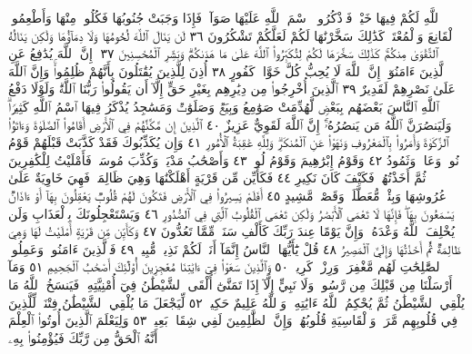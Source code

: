 ٱللَّهِ لَكُمْ فِيهَا خَيْرࣱۖ فَٱذْكُرُوا۟ ٱسْمَ ٱللَّهِ عَلَيْهَا صَوَآفَّۖ فَإِذَا وَجَبَتْ
جُنُوبُهَا فَكُلُوا۟ مِنْهَا وَأَطْعِمُوا۟ ٱلْقَانِعَ وَٱلْمُعْتَرَّۚ كَذَٰلِكَ سَخَّرْنَٰهَا
لَكُمْ لَعَلَّكُمْ تَشْكُرُونَ ٣٦ لَن يَنَالَ ٱللَّهَ لُحُومُهَا وَلَا دِمَآؤُهَا
وَلَٰكِن يَنَالُهُ ٱلتَّقْوَىٰ مِنكُمْۚ كَذَٰلِكَ سَخَّرَهَا لَكُمْ لِتُكَبِّرُوا۟
ٱللَّهَ عَلَىٰ مَا هَدَىٰكُمْۗ وَبَشِّرِ ٱلْمُحْسِنِينَ ٣٧۞ إِنَّ ٱللَّهَ يُدَٰفِعُ
عَنِ ٱلَّذِينَ ءَامَنُوٓا۟ۗ إِنَّ ٱللَّهَ لَا يُحِبُّ كُلَّ خَوَّانࣲ كَفُورٍ ٣٨
أُذِنَ لِلَّذِينَ يُقَٰتَلُونَ بِأَنَّهُمْ ظُلِمُوا۟ۚ وَإِنَّ ٱللَّهَ عَلَىٰ نَصْرِهِمْ
لَقَدِيرٌ ٣٩ ٱلَّذِينَ أُخْرِجُوا۟ مِن دِيَٰرِهِم بِغَيْرِ حَقٍّ إِلَّآ أَن يَقُولُوا۟
رَبُّنَا ٱللَّهُۗ وَلَوْلَا دَفْعُ ٱللَّهِ ٱلنَّاسَ بَعْضَهُم بِبَعْضࣲ لَّهُدِّمَتْ
صَوَٰمِعُ وَبِيَعࣱ وَصَلَوَٰتࣱ وَمَسَٰجِدُ يُذْكَرُ فِيهَا ٱسْمُ ٱللَّهِ
كَثِيرࣰاۗ وَلَيَنصُرَنَّ ٱللَّهُ مَن يَنصُرُهُۥٓۚ إِنَّ ٱللَّهَ لَقَوِيٌّ
عَزِيزٌ ٤٠ ٱلَّذِينَ إِن مَّكَّنَّٰهُمْ فِي ٱلْأَرْضِ أَقَامُوا۟ ٱلصَّلَوٰةَ
وَءَاتَوُا۟ ٱلزَّكَوٰةَ وَأَمَرُوا۟ بِٱلْمَعْرُوفِ وَنَهَوْا۟ عَنِ ٱلْمُنكَرِۗ
وَلِلَّهِ عَٰقِبَةُ ٱلْأُمُورِ ٤١ وَإِن يُكَذِّبُوكَ فَقَدْ كَذَّبَتْ
قَبْلَهُمْ قَوْمُ نُوحࣲ وَعَادࣱ وَثَمُودُ ٤٢ وَقَوْمُ إِبْرَٰهِيمَ وَقَوْمُ
لُوطࣲ ٤٣ وَأَصْحَٰبُ مَدْيَنَۖ وَكُذِّبَ مُوسَىٰۖ فَأَمْلَيْتُ لِلْكَٰفِرِينَ
ثُمَّ أَخَذْتُهُمْۖ فَكَيْفَ كَانَ نَكِيرِ ٤٤ فَكَأَيِّن مِّن قَرْيَةٍ
أَهْلَكْنَٰهَا وَهِيَ ظَالِمَةࣱ فَهِيَ خَاوِيَةٌ عَلَىٰ عُرُوشِهَا وَبِئْرࣲ
مُّعَطَّلَةࣲ وَقَصْرࣲ مَّشِيدٍ ٤٥ أَفَلَمْ يَسِيرُوا۟ فِي ٱلْأَرْضِ فَتَكُونَ
لَهُمْ قُلُوبࣱ يَعْقِلُونَ بِهَآ أَوْ ءَاذَانࣱ يَسْمَعُونَ بِهَاۖ فَإِنَّهَا
لَا تَعْمَى ٱلْأَبْصَٰرُ وَلَٰكِن تَعْمَى ٱلْقُلُوبُ ٱلَّتِي فِي ٱلصُّدُورِ ٤٦
وَيَسْتَعْجِلُونَكَ بِٱلْعَذَابِ وَلَن يُخْلِفَ ٱللَّهُ وَعْدَهُۥۚ وَإِنَّ يَوْمًا
عِندَ رَبِّكَ كَأَلْفِ سَنَةࣲ مِّمَّا تَعُدُّونَ ٤٧ وَكَأَيِّن مِّن قَرْيَةٍ
أَمْلَيْتُ لَهَا وَهِيَ ظَالِمَةࣱ ثُمَّ أَخَذْتُهَا وَإِلَيَّ ٱلْمَصِيرُ ٤٨
قُلْ يَٰٓأَيُّهَا ٱلنَّاسُ إِنَّمَآ أَنَا۠ لَكُمْ نَذِيرࣱ مُّبِينࣱ ٤٩ فَٱلَّذِينَ
ءَامَنُوا۟ وَعَمِلُوا۟ ٱلصَّٰلِحَٰتِ لَهُم مَّغْفِرَةࣱ وَرِزْقࣱ كَرِيمࣱ ٥٠
وَٱلَّذِينَ سَعَوْا۟ فِيٓ ءَايَٰتِنَا مُعَٰجِزِينَ أُو۟لَٰٓئِكَ أَصْحَٰبُ
ٱلْجَحِيمِ ٥١ وَمَآ أَرْسَلْنَا مِن قَبْلِكَ مِن رَّسُولࣲ وَلَا نَبِيٍّ إِلَّآ
إِذَا تَمَنَّىٰٓ أَلْقَى ٱلشَّيْطَٰنُ فِيٓ أُمْنِيَّتِهِۦ فَيَنسَخُ ٱللَّهُ مَا يُلْقِي
ٱلشَّيْطَٰنُ ثُمَّ يُحْكِمُ ٱللَّهُ ءَايَٰتِهِۦۗ وَٱللَّهُ عَلِيمٌ حَكِيمࣱ ٥٢ لِّيَجْعَلَ
مَا يُلْقِي ٱلشَّيْطَٰنُ فِتْنَةࣰ لِّلَّذِينَ فِي قُلُوبِهِم مَّرَضࣱ وَٱلْقَاسِيَةِ
قُلُوبُهُمْۗ وَإِنَّ ٱلظَّٰلِمِينَ لَفِي شِقَاقِۭ بَعِيدࣲ ٥٣ وَلِيَعْلَمَ
ٱلَّذِينَ أُوتُوا۟ ٱلْعِلْمَ أَنَّهُ ٱلْحَقُّ مِن رَّبِّكَ فَيُؤْمِنُوا۟ بِهِۦ
